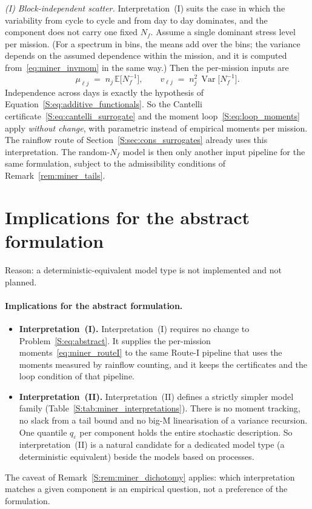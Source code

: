 \documentclass[11pt,a4paper]{article}
\theoremstyle{plain}
\theoremstyle{definition}
\theoremstyle{remark}
\begin{document}
\emph{(I) Block-independent scatter.}
Interpretation~(I) suits the case in which the variability from cycle to cycle and from day to day dominates, and the component does not carry one fixed $N_f$.
Assume a single dominant stress level per mission.
(For a spectrum in bins, the means add over the bins; the variance depends on the assumed dependence within the mission, and it is computed from~\eqref{eq:miner_invmom} in the same way.)
Then the per-mission inputs are
\begin{equation}\label{eq:miner_routeI}
  \mu_{\ell j} \;=\; n_j\,\mathbb{E}\big[N_f^{-1}\big],
  \qquad
  v_{\ell j} \;=\; n_j^2\,\operatorname{Var}\big[N_f^{-1}\big].
\end{equation}
Independence across days is exactly the hypothesis of Equation~\eqref{S:eq:additive_functionals}.
So the Cantelli certificate~\eqref{S:eq:cantelli_surrogate} and the moment loop~\eqref{S:eq:loop_moments} apply \emph{without change}, with parametric instead of empirical moments per mission.
The rainflow route of Section~\ref{S:sec:cons_surrogates} already uses this interpretation.
The random-$N_f$ model is then only another input pipeline for the same formulation, subject to the admissibility conditions of Remark~\ref{rem:miner_tails}.

\section{Implications for the abstract formulation}

Reason: a deterministic-equivalent model type is not implemented and not planned.

\paragraph{Implications for the abstract formulation.}
\begin{itemize}
  \item \textbf{Interpretation~(I).} Interpretation~(I) requires no change to Problem~\eqref{S:eq:abstract}.
    It supplies the per-mission moments~\eqref{eq:miner_routeI} to the same Route-I pipeline that uses the moments measured by rainflow counting, and it keeps the certificates and the loop condition of that pipeline.
  \item \textbf{Interpretation~(II).} Interpretation~(II) defines a strictly simpler model family (Table~\ref{S:tab:miner_interpretations}).
    There is no moment tracking, no slack from a tail bound and no big-M linearisation of a variance recursion.
    One quantile $q_\varepsilon$ per component holds the entire stochastic description.
    So interpretation~(II) is a natural candidate for a dedicated model type (a deterministic equivalent) beside the models based on processes.
\end{itemize}
The caveat of Remark~\ref{S:rem:miner_dichotomy} applies: which interpretation matches a given component is an empirical question, not a preference of the formulation.
\end{document}
